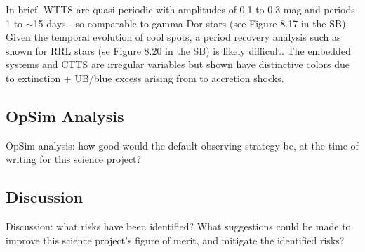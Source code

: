 In brief, WTTS are quasi-periodic with amplitudes of 0.1 to 0.3 mag
and periods 1 to $\sim$15 days - so comparable to gamma Dor stars (see
Figure 8.17 in the SB). Given the temporal evolution of cool spots, a
period recovery analysis such as shown for RRL stars (se Figure 8.20
in the SB) is likely difficult. The embedded systems and CTTS are
irregular variables but shown have distinctive colors due to
extinction + UB/blue excess arising from to accretion shocks.


\subsection{OpSim Analysis}
\label{sec:\secname:analysis}

OpSim analysis: how good would the default observing strategy be, at
the time of writing for this science project?



\subsection{Discussion}
\label{sec:\secname:discussion}

Discussion: what risks have been identified? What suggestions could be
made to improve this science project's figure of merit, and mitigate
the identified risks?



\navigationbar

